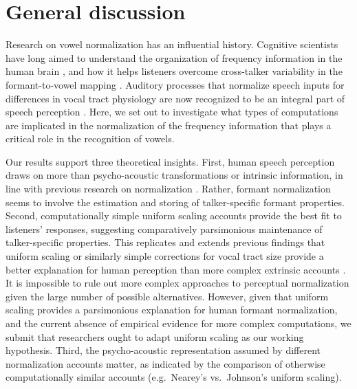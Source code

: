 \documentclass[preprint]{JASA}
\begin{document}
\section{General discussion}\label{sec:G-D}

Research on vowel normalization has an influential history. Cognitive scientists have long aimed to understand the organization of frequency information in the human brain \citep{stevens-volkmann1940, siegel1965}, and how it helps listeners overcome cross-talker variability in the formant-to-vowel mapping \citep[e.g.,][]{joos1948, fant1975, nordstrom-lindblom1975}. Auditory processes that normalize speech inputs for differences in vocal tract physiology are now recognized to be an integral part of speech perception \citep{mcmurray-jongman2011, johnson-sjerps2021, xie2023}. Here, we set out to investigate what types of computations are implicated in the normalization of the frequency information that plays a critical role in the recognition of vowels.

Our results support three theoretical insights. First, human speech perception draws on more than psycho-acoustic transformations or intrinsic information, in line with previous research on normalization \citep{nearey1989, ladefoged-broadbent1957, adank2004}. Rather, formant normalization seems to involve the estimation and storing of talker-specific formant properties. Second, computationally simple uniform scaling accounts provide the best fit to listeners' responses, suggesting comparatively parsimonious maintenance of talker-specific properties. This replicates and extends previous findings that uniform scaling or similarly simple corrections for vocal tract size provide a better explanation for human perception than more complex extrinsic accounts \citep{barreda2021, richter2017}. It is impossible to rule out more complex approaches to perceptual normalization given the large number of possible alternatives. However, given that uniform scaling provides a parsimonious explanation for human formant normalization, and the current absence of empirical evidence for more complex computations, we submit that researchers ought to adapt uniform scaling as our working hypothesis. Third, the psycho-acoustic representation assumed by different normalization accounts matter, as indicated by the comparison of otherwise computationally similar accounts (e.g.~Nearey's vs.~Johnson's uniform scaling).
\end{document}
